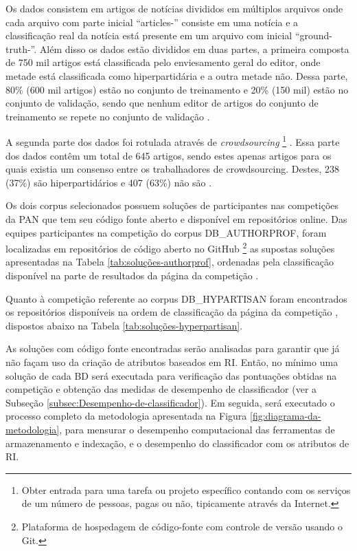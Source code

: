 \begin{itemize}
        Os dados consistem em artigos de notícias divididos em múltiplos arquivos onde cada arquivo com parte inicial ``articles-'' consiste em uma notícia e a classificação real da notícia está presente em um arquivo com inicial ``ground-truth-''. 
        Além disso os dados estão divididos em duas partes, a primeira composta de 750 mil artigos está classificada pelo enviesamento geral do editor, onde metade está classificada como hiperpartidária e a outra metade não. 
        Dessa parte, 80\% (600 mil artigos) estão no conjunto de treinamento e 20\% (150 mil) estão no conjunto de validação, sendo que nenhum editor de artigos do conjunto de treinamento se repete no conjunto de validação \cite{johannes_kiesel_2018_1489920}.
        
        A segunda parte dos dados foi rotulada através de \textit{crowdsourcing}
        \footnote{Obter entrada para uma tarefa ou projeto específico contando com os serviços de um número de pessoas, pagas ou não, tipicamente através da Internet.}
        . 
        Essa parte dos dados contêm um total de 645 artigos, sendo estes apenas artigos para os quais existia um consenso entre os trabalhadores de crowdsourcing. 
        Destes, 238 (37\%) são hiperpartidários e 407 (63\%) não são \cite{johannes_kiesel_2018_1489920}. 
    \end{itemize}
    
    Os dois corpus selecionados possuem soluções de participantes nas competições da PAN que tem seu código fonte aberto e disponível em repositórios online.
    Das equipes participantes na competição do corpus DB\_AUTHORPROF, foram localizadas em repositórios de código aberto no GitHub
    \footnote{Plataforma de hospedagem de código-fonte com controle de versão usando o Git.}
     as supostas soluções  apresentadas na Tabela \ref{tab:soluções-authorprof}, ordenadas pela classificação disponível na parte de resultados da página da competição .    
    
    

    Quanto à competição referente ao corpus DB\_HYPARTISAN foram encontrados os repositórios disponíveis na ordem de classificação da página da competição \cite{PAN_HND_2019}, dispostos abaixo na Tabela \ref{tab:soluções-hyperpartisan}.
    
    

    As soluções com código fonte encontradas serão analisadas para garantir que já não façam uso da criação de atributos baseados em RI.
    Então, no mínimo uma solução de cada BD será executada para verificação das pontuações obtidas na competição e obtenção das medidas de desempenho de classificador (ver a Subseção \ref{subsec:Desempenho-de-classificador}).
    Em seguida, será executado o processo completo da metodologia apresentada na Figura \ref{fig:diagrama-da-metodologia}, para mensurar o desempenho computacional das ferramentas de armazenamento e indexação, e o desempenho do classificador com os atributos de RI.
    
